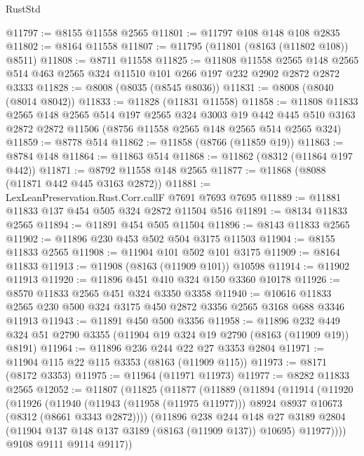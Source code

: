 \begin{lexlean}{RustStd}
\begin{coremodule}
@11797 := @8155 @11558 @2565
@11801 := @11797 @108 @148 @108 @2835
@11802 := @8164 @11558
@11807 := @11795 (@11801 (@8163 (@11802 @108)) @8511)
@11808 := @8711 @11558
@11825 := @11808
    @11558
    @2565
    @148
    @2565
    @514
    @463
    @2565
    @324
    @11510
    @101
    @266
    @197
    @232
    @2902
    @2872
    @2872
    @3333
@11828 := @8008 (@8035 (@8545 @8036))
@11831 := @8008 (@8040 (@8014 @8042))
@11833 := @11828 (@11831 @11558)
@11858 := @11808
    @11833
    @2565
    @148
    @2565
    @514
    @197
    @2565
    @324
    @3003
    @19
    @442
    @445
    @510
    @3163
    @2872
    @2872
    @11506
    (@8756 @11558 @2565 @148 @2565 @514 @2565 @324)
@11859 := @8778 @514
@11862 := @11858 (@8766 (@11859 @19))
@11863 := @8784 @148
@11864 := @11863 @514
@11868 := @11862 (@8312 (@11864 @197 @442))
@11871 := @8792 @11558 @148 @2565
@11877 := @11868 (@8088 (@11871 @442 @445 @3163 @2872))
@11881 := LexLeanPreservation.Rust.Corr.callF @7691 @7693 @7695
@11889 := @11881 @11833 @137 @454 @505 @324 @2872 @11504 @516
@11891 := @8134 @11833 @2565
@11894 := @11891 @454 @505 @11504
@11896 := @8143 @11833 @2565
@11902 := @11896 @230 @453 @502 @504 @3175 @11503
@11904 := @8155 @11833 @2565
@11908 := @11904 @101 @502 @101 @3175
@11909 := @8164 @11833
@11913 := @11908 (@8163 (@11909 @101)) @10598
@11914 := @11902 @11913
@11920 := @11896 @451 @410 @324 @150 @3360 @10178
@11926 := @8570 @11833 @2565 @451 @324 @3350 @3358
@11940 := @10616 @11833 @2565 @230 @500 @324 @3175 @450 @2872 @3356 @2565 @3168 @688 @3346 @11913
@11943 := @11891 @450 @500 @3356
@11958 := @11896
    @232
    @449
    @324
    @51
    @2790
    @3355
    (@11904 @19 @324 @19 @2790 (@8163 (@11909 @19)) @8191)
@11964 := @11896 @236 @244 @22 @27 @3353 @2804
@11971 := @11904 @115 @22 @115 @3353 (@8163 (@11909 @115))
@11973 := @8171 (@8172 @3353)
@11975 := @11964 (@11971 @11973)
@11977 := @8282 @11833 @2565
@12052 := @11807
    (@11825
      (@11877
        (@11889
          (@11894
            (@11914
              (@11920
                (@11926
                  (@11940
                    (@11943 (@11958 (@11975 @11977)))
                    @8924
                    @8937
                    @10673
                    (@8312 (@8661 @3343 @2872))))
                (@11896
                  @238
                  @244
                  @148
                  @27
                  @3189
                  @2804
                  (@11904 @137 @148 @137 @3189 (@8163 (@11909 @137)) @10695)
                  @11977))))
          @9108
          @9111
          @9114
          @9117))

\end{coremodule}
\end{lexlean}
